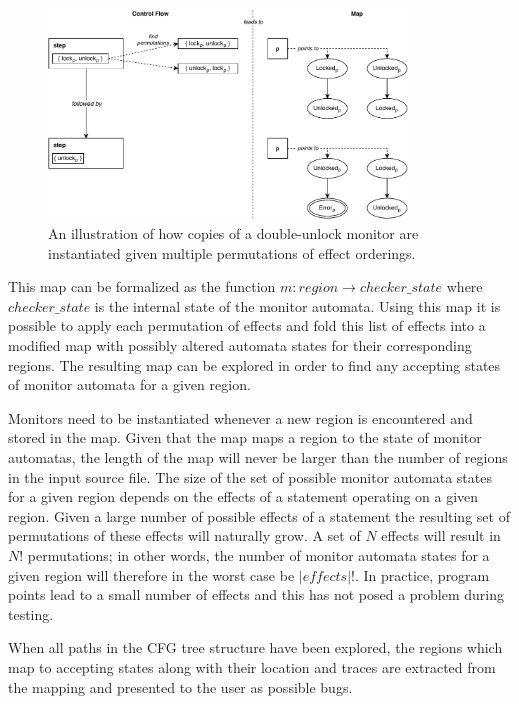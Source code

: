 \begin{figure}[H]
    \centering
    \includegraphics[width=0.85\textwidth]{implementation/figures/permutation-copy}
    \caption{An illustration of how copies of a double-unlock monitor are instantiated given multiple permutations of effect orderings.}
    \label{permutation-copy}
\end{figure}

\noindent This map can be formalized as the function $m: region \rightarrow { checker\_state }$ where $ checker\_state $ is the internal state of the monitor automata. Using this map it is possible to apply each permutation of effects and fold this list of effects into a modified map with possibly altered automata states for their corresponding regions. The resulting map can be explored in order to find any accepting states of monitor automata for a given region. 

\newpar Monitors need to be instantiated whenever a new region is encountered and stored in the map. Given that the map maps a region to the state of monitor automatas, the length of the map will never be larger than the number of regions in the input source file. The size of the set of possible monitor automata states for a given region depends on the effects of a statement operating on a given region. Given a large number of possible effects of a statement the resulting set of permutations of these effects will naturally grow. A set of $N$ effects will result in $N!$ permutations; in other words, the number of monitor automata states for a given region will therefore in the worst case be $|\mathit{effects}|!$. In practice, program points lead to a small number of effects and this has not posed a problem during testing.

\newpar When all paths in the CFG tree structure have been explored, the regions which map to accepting states along with their location and traces are extracted from the mapping and presented to the user as possible bugs.  

